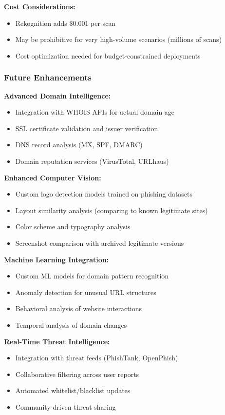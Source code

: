 \documentclass[conference]{IEEEtran}
\begin{document}
\textbf{Cost Considerations:}
\begin{itemize}
\item Rekognition adds \$0.001 per scan
\item May be prohibitive for very high-volume scenarios (millions of scans)
\item Cost optimization needed for budget-constrained deployments
\end{itemize}

\subsubsection{Future Enhancements}

\textbf{Advanced Domain Intelligence:}
\begin{itemize}
\item Integration with WHOIS APIs for actual domain age
\item SSL certificate validation and issuer verification
\item DNS record analysis (MX, SPF, DMARC)
\item Domain reputation services (VirusTotal, URLhaus)
\end{itemize}

\textbf{Enhanced Computer Vision:}
\begin{itemize}
\item Custom logo detection models trained on phishing datasets
\item Layout similarity analysis (comparing to known legitimate sites)
\item Color scheme and typography analysis
\item Screenshot comparison with archived legitimate versions
\end{itemize}


\textbf{Machine Learning Integration:}
\begin{itemize}
\item Custom ML models for domain pattern recognition
\item Anomaly detection for unusual URL structures
\item Behavioral analysis of website interactions
\item Temporal analysis of domain changes
\end{itemize}

\textbf{Real-Time Threat Intelligence:}
\begin{itemize}
\item Integration with threat feeds (PhishTank, OpenPhish)
\item Collaborative filtering across user reports
\item Automated whitelist/blacklist updates
\item Community-driven threat sharing
\end{itemize}
\end{document}
